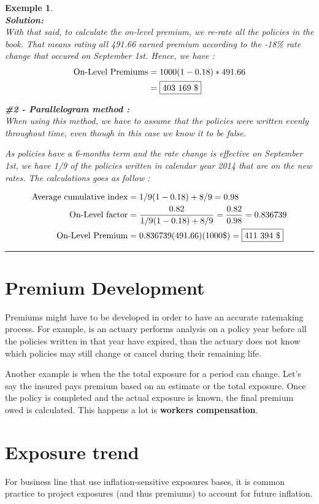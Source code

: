 \documentclass[11pt, english]{memoir}
\numberwithin{definition}{section}
\newtheorem{example}{Exemple}[section]
\newenvironment{exemple}
{
	\begin{example} \normalfont \ \\ 
	}
	{
		\hfill\rule{0.5em}{0.5em}\end{example}
}
\newenvironment{solution}
{\noindent\textbf{Solution:} \\ 
}{
}
\begin{document}
\begin{exemple}
\begin{solution}
			With that said, to calculate the on-level premium, we re-rate all the policies in the book. That means rating all 491.66 earned premium according to the -18\% rate change that occured on September 1st. Hence, we have : 
			\begin{align*}
			\text{On-Level Premiums} &= 1000(1-0.18)*491.66\\
			&=\fbox{403 169 \$}
			\end{align*} 
			
		\textbf{\#2 - Parallelogram method : } \\[0pt]
			When using this method, we have to assume that the policies were written evenly throughout time, even though in this case we know it to be false. 
			
			As policies have a 6-months term and the rate change is effective on September 1st, we have 1/9 of the policies written in calendar year 2014 that are on the new rates. The calculations goes as follow : 
			
			\begin{align*}
			\text{Average cumulative index} &= 1/9(1-0.18) + 8/9 = 0.98\\
			\text{On-Level factor} &= \frac{0.82}{1/9(1-0.18) + 8/9} = \frac{0.82}{0.98} = 0.836739\\
			\text{On-Level Premium} &= 0.836739(491.66)(1000\$) = \fbox{411 394 \$}
			\end{align*}
	\end{solution}
	\end{exemple}
	
	\section{Premium Development}
	Premiums might have to be developed in order to have an accurate ratemaking process. For example, is an actuary performs analysis on a policy year before all the policies written in that year have expired, than the actuary does not know which policies may still change or cancel during their remaining life. 
	
	Another example is when the the total exposure for a period can change. Let's say the insured pays premium based on an estimate or the total exposure. Once the policy is completed and the actual exposure is known, the final premium owed is calculated. This happens a lot is \textbf{workers compensation}. 
	
	\section{Exposure trend}
	For business line that use inflation-sensitive exposures bases, it is common practice to project exposures (and thus premiums) to account for future inflation. 
	
\end{document}
